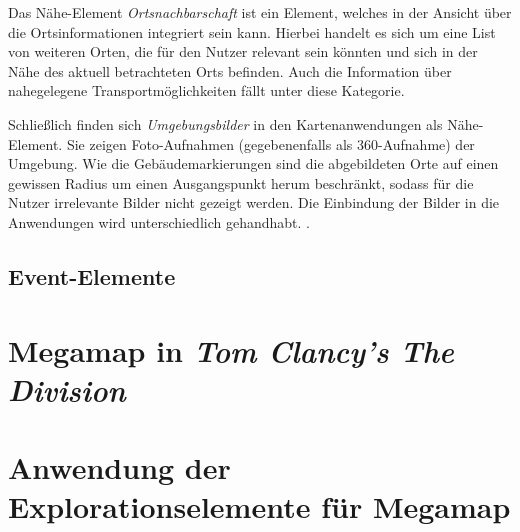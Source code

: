 Das Nähe-Element \emph{Ortsnachbarschaft} ist ein Element, welches in der Ansicht über die Ortsinformationen integriert sein kann.
Hierbei handelt es sich um eine List von weiteren Orten, die für den Nutzer relevant sein könnten und sich in der Nähe des aktuell betrachteten Orts befinden.
Auch die Information über nahegelegene Transportmöglichkeiten fällt unter diese Kategorie.

Schließlich finden sich \emph{Umgebungsbilder} in den Kartenanwendungen als Nähe-Element.
Sie zeigen Foto-Aufnahmen (gegebenenfalls als 360\textdegree-Aufnahme) der Umgebung.
Wie die Gebäudemarkierungen sind die abgebildeten Orte auf einen gewissen Radius um einen Ausgangspunkt herum beschränkt, sodass für die Nutzer irrelevante Bilder nicht gezeigt werden.
Die Einbindung der Bilder in die Anwendungen wird unterschiedlich gehandhabt.
.

\subsection{Event-Elemente}



\section{Megamap in \emph{Tom Clancy's The Division}}

\section{Anwendung der Explorationselemente für Megamap}

%
\cleardoublepage

